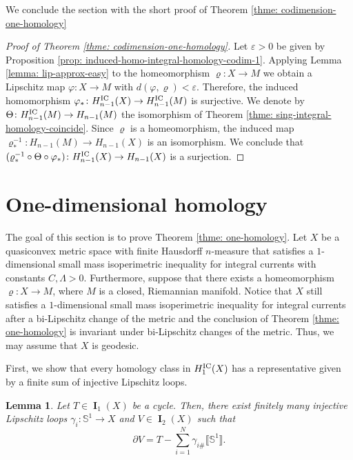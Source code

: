 \documentclass{amsart}
\newtheorem{lemma}[theorem]{Lemma}
\numberwithin{equation}{section}
\DeclareMathOperator{\bI}{\mathbf{I}}
\newcommand{\bb}[1]{\llbracket #1\rrbracket}
\begin{document}
    We conclude the section with the short proof of Theorem \ref{thme: codimension-one-homology}

    \begin{proof}[Proof of Theorem \ref{thme: codimension-one-homology}]
        Let $\varepsilon>0$ be given by Proposition \ref{prop: induced-homo-integral-homology-codim-1}. Applying Lemma \ref{lemma: lip-approx-easy} to the homeomorphism $\varrho\colon X \to M$ we obtain a Lipschitz map $\varphi\colon X \to M$ with $d(\varphi,\varrho)<\varepsilon$. Therefore, the induced homomorphism $\varphi_*\colon H_{n-1}^\textup{IC}(X)\to H_{n-1}^\textup{IC}(M)$ is surjective. We denote by $\Theta \colon H_{n-1}^\textup{IC}(M) \to H_{n-1}(M)$ the isomorphism of Theorem \ref{thme: sing-integral-homology-coincide}. Since $\varrho$ is a homeomorphism, the induced map $\varrho^{-1}_*\colon H_{n-1}(M) \to H_{n-1}(X)$ is an isomorphism. We conclude that $(\varrho^{-1}_* \circ \Theta \circ \varphi_*)\colon H_{n-1}^\textup{IC}(X) \to H_{n-1}(X)$ is a surjection. 
    \end{proof}

\section{One-dimensional homology}\label{sec: one-dime}
        The goal of this section is to prove Theorem \ref{thme: one-homology}. Let $X$ be a quasiconvex metric space with finite Hausdorff $n$-measure that satisfies a $1$-dimensional small mass isoperimetric inequality for integral currents with constants $ C, \Lambda>0$. Furthermore, suppose that there exists a homeomorphism $\varrho\colon X \to M$, where $M$ is a closed, Riemannian manifold. Notice that $X$ still satisfies a $1$-dimensional small mass isoperimetric inequality for integral currents after a bi-Lipschitz change of the metric and the conclusion of Theorem \ref{thme: one-homology} is invariant under bi-Lipschitz changes of the metric. Thus, we may assume that $X$ is geodesic. 
        
        \medskip

        First, we show that every homology class in $H_1^\textup{IC}(X)$ has a representative given by a finite sum of injective Lipschitz loops.

        \begin{lemma}\label{lemma: integral-homology-repres-finite-loops-}
            Let $T\in \bI_1(X)$ be a cycle. Then, there exist finitely many injective Lipschitz loops $\gamma_i \colon \mathbb{S}^1 \to X$ and $V \in \bI_2(X)$ such that
            $$\partial V = T - \sum_{i=1}^N \gamma_{i\#}\bb{\mathbb{S}^1}.$$
        \end{lemma}
\end{document}
